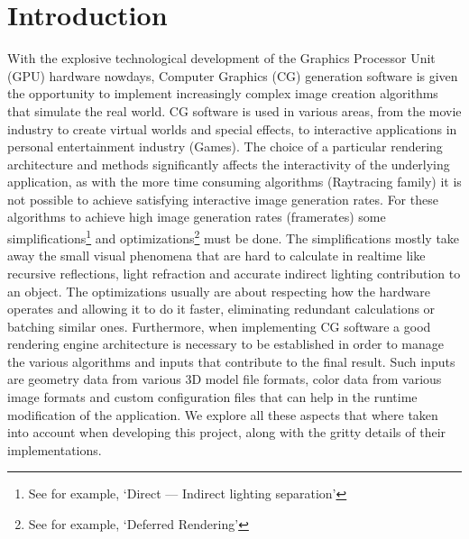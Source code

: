 \section{Introduction}
With the explosive technological development of the Graphics Processor Unit (GPU) hardware nowdays,
Computer Graphics (CG) generation software is given the opportunity to implement increasingly complex image
creation algorithms that simulate the real world. CG software is used in various areas, from the movie
industry to create virtual worlds and special effects, to interactive applications in personal entertainment
industry (Games). The choice of a particular rendering architecture and methods significantly affects
the interactivity of the underlying application, as with the more time consuming algorithms
(Raytracing family) it is not possible to achieve satisfying interactive image
generation rates. For these algorithms to achieve high image generation rates (framerates) some
simplifications\footnote{See for example, `Direct --- Indirect lighting separation'} and optimizations\footnote{See
for example, `Deferred Rendering'} must be done. The simplifications mostly take away the small visual phenomena
that are hard to calculate in realtime like recursive reflections, light refraction and accurate indirect lighting
contribution to an object. The optimizations usually are about respecting how the hardware operates and allowing
it to do it faster, eliminating redundant calculations or batching similar ones. Furthermore, when implementing CG
software a good rendering engine architecture is necessary to be established in order to manage the various algorithms and inputs
that contribute to the final result. Such inputs are geometry data from various 3D model file formats, color data
from various image formats and custom configuration files that can help in the runtime modification
of the application. We explore all these aspects that where taken into account when developing this
project, along with the gritty details of their implementations.

